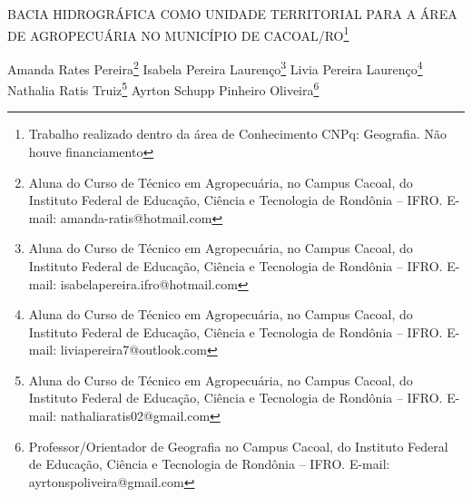 \documentclass[article,12pt,onesidea,4paper,english,brazil]{abntex2}
\begin{document}
	
	
	\frenchspacing 
	
	\begin{center}
		\LARGE BACIA HIDROGRÁFICA COMO UNIDADE TERRITORIAL PARA A ÁREA DE AGROPECUÁRIA NO MUNICÍPIO DE CACOAL/RO\footnote{Trabalho realizado dentro da área de Conhecimento CNPq: Geografia. Não houve financiamento}
		
		\normalsize
	Amanda Rates Pereira\footnote{Aluna do Curso de Técnico em Agropecuária, no Campus Cacoal, do Instituto Federal de Educação, Ciência e Tecnologia de Rondônia – IFRO. E-mail: amanda-ratis@hotmail.com} 
		Isabela Pereira Laurenço\footnote{Aluna do Curso de Técnico em Agropecuária, no Campus Cacoal, do Instituto Federal de Educação, Ciência e Tecnologia de Rondônia – IFRO. E-mail: isabelapereira.ifro@hotmail.com} 
	Livia Pereira Laurenço\footnote{Aluna do Curso de Técnico em Agropecuária, no Campus Cacoal, do Instituto Federal de Educação, Ciência e Tecnologia de Rondônia – IFRO. E-mail: liviapereira7@outlook.com} \\
	Nathalia Ratis Truiz\footnote{Aluna do Curso de Técnico em Agropecuária, no Campus Cacoal, do Instituto Federal de Educação, Ciência e Tecnologia de Rondônia – IFRO. E-mail: nathaliaratis02@gmail.com}
	Ayrton Schupp Pinheiro Oliveira\footnote{Professor/Orientador de Geografia no Campus Cacoal, do Instituto Federal de Educação, Ciência e Tecnologia de Rondônia – IFRO. E-mail: ayrtonspoliveira@gmail.com} 
	\end{center}
	
\end{document}
